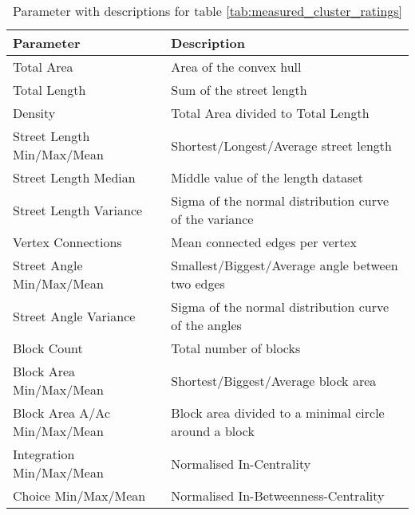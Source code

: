 \begin{table}[h]
\begin{center}
    \begin{tabular}{ | l | l |} \hline 
        Parameter & Description \\ 
        \hline
        Total Area &  Area of the convex hull \\ \hline
        Total Length & Sum of the street length \\ \hline
        Density & Total Area divided to Total Length  \\ \hline
        
        Street Length Min/Max/Mean & Shortest/Longest/Average street length  \\ \hline
        Street Length Median & Middle value of the length dataset \\ \hline
        Street Length Variance & Sigma of the normal distribution curve of the variance \\ \hline
        
        Vertex Connections & Mean connected edges per vertex  \\ \hline
        
        Street Angle Min/Max/Mean & Smallest/Biggest/Average angle between two edges \\ \hline
        Street Angle Variance & Sigma of the normal distribution curve of the angles \\ \hline
        
        Block Count & Total number of blocks \\ \hline
        Block Area Min/Max/Mean & Shortest/Biggest/Average block area \\ \hline
        Block Area A/Ac Min/Max/Mean & Block area divided to a minimal circle around a block \\ \hline
        
        Integration Min/Max/Mean & Normalised In-Centrality \\ \hline
        Choice Min/Max/Mean & Normalised In-Betweenness-Centrality \\ \hline
    \end{tabular}
    \caption{Parameter with descriptions for table \ref{tab:measured_cluster_ratings}}
    \label{tab:cluterAnalysisDescription}
\end{center}
\end{table}


